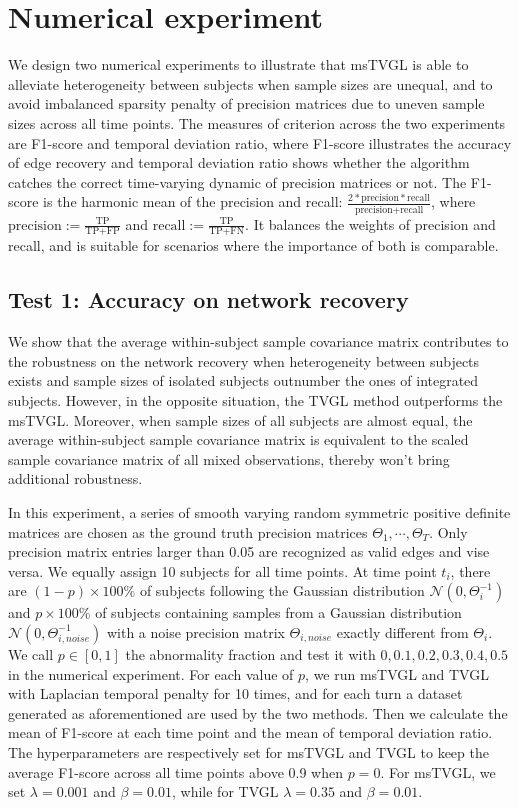 \section{Numerical experiment}
We design two numerical experiments to illustrate that msTVGL is able to alleviate heterogeneity between subjects when sample sizes are unequal, 
and to avoid imbalanced sparsity penalty of precision matrices due to uneven sample sizes across all time points.
The measures of criterion across the two experiments are F1-score and temporal deviation ratio, 
where F1-score illustrates the accuracy of edge recovery and temporal deviation ratio shows whether the algorithm catches the correct time-varying dynamic of precision matrices or not. 
The F1-score is the harmonic mean of the precision and recall: $\frac{2*\text{precision}*\text{recall}}{\text{precision} + \text{recall}}$, 
where $\text{precision}:=\frac{\text{TP}}{\text{TP} + \text{FP}}$ and $\text{recall}:=\frac{\text{TP}}{\text{TP} + \text{FN}}$.
It balances the weights of precision and recall, 
and is suitable for scenarios where the importance of both is comparable.

\subsection{Test 1: Accuracy on network recovery}
We show that the average within-subject sample covariance matrix contributes to the robustness on the network recovery 
when heterogeneity between subjects exists and sample sizes of isolated subjects outnumber the ones of integrated subjects. 
However, in the opposite situation, the TVGL method outperforms the msTVGL. 
Moreover, when sample sizes of all subjects are almost equal, 
the average within-subject sample covariance matrix is equivalent to the scaled sample covariance matrix of all mixed observations, 
thereby won't bring additional robustness.

In this experiment, 
a series of smooth varying random symmetric positive definite matrices are chosen as the ground truth precision matrices $\Theta_1,\cdots,\Theta_T$. 
Only precision matrix entries larger than 0.05 are recognized as valid edges and vise versa. 
We equally assign 10 subjects for all time points.  
At time point $t_i$, there are $(1-p)\times100\%$ of subjects following the Gaussian distribution $\mathcal{N}(0,\Theta_i^{-1})$ and 
$p\times100\%$ of subjects containing samples from a Gaussian distribution $\mathcal{N}(0,\Theta_{i,noise}^{-1})$ with a noise precision matrix $\Theta_{i,noise}$ exactly different from $\Theta_i$. 
We call $p\in[0,1]$ the abnormality fraction and test it with $0, 0.1, 0.2, 0.3, 0.4, 0.5$ in the numerical experiment. 
For each value of $p$, we run msTVGL and TVGL with Laplacian temporal penalty for 10 times, 
and for each turn a dataset generated as aforementioned are used by the two methods.
Then we calculate the mean of F1-score at each time point and the mean of temporal deviation ratio. 
The hyperparameters are respectively set for msTVGL and TVGL to keep the average F1-score across all time points above 0.9 when $p=0$. 
For msTVGL, we set $\lambda=0.001$ and $\beta=0.01$, 
while for TVGL $\lambda=0.35$ and $\beta=0.01$. 

